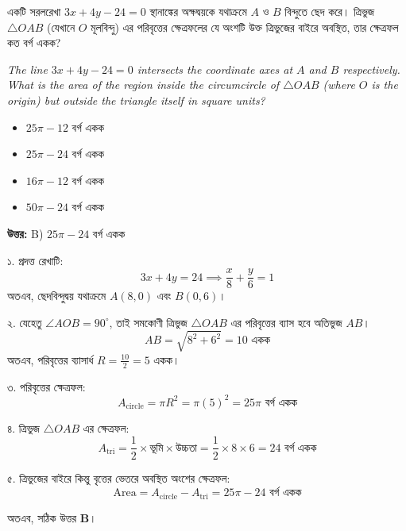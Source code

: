 \documentclass[12pt, a4paper]{article}
\begin{document}
\begin{tcolorbox}[questionbox={প্রশ্ন (Question) 43}]
    \noindent
    একটি সরলরেখা $3x + 4y - 24 = 0$ স্থানাঙ্কের অক্ষদ্বয়কে যথাক্রমে $A$ ও $B$ বিন্দুতে ছেদ করে। ত্রিভুজ $\triangle OAB$ (যেখানে $O$ মূলবিন্দু) এর পরিবৃত্তের ক্ষেত্রফলের যে অংশটি উক্ত ত্রিভুজের বাইরে অবস্থিত, তার ক্ষেত্রফল কত বর্গ একক?
    
    \vspace{0.8em}
    \begin{english}
    \noindent\textit{\color{darkgray}
    The line $3x + 4y - 24 = 0$ intersects the coordinate axes at $A$ and $B$ respectively. What is the area of the region inside the circumcircle of $\triangle OAB$ (where $O$ is the origin) but outside the triangle itself in square units?
    }
    \end{english}
\end{tcolorbox}

\vspace{1em}
\begin{itemize}[label={}, leftmargin=1cm, itemsep=0.5em]
    \item[\textbf{A)}] $25\pi - 12$ বর্গ একক
    \item[\textbf{B)}] $25\pi - 24$ বর্গ একক
    \item[\textbf{C)}] $16\pi - 12$ বর্গ একক
    \item[\textbf{D)}] $50\pi - 24$ বর্গ একক
\end{itemize}

\vspace{0.5em}
\begin{tcolorbox}[answerbox]
    \textbf{\color{success} উত্তর:} B) $25\pi - 24$ বর্গ একক
\end{tcolorbox}
\vspace{1em}

\begin{tcolorbox}[solutionbox={সমাধান (Solution)}]
    \noindent
    ১. প্রদত্ত রেখাটি: 
    \[ 3x + 4y = 24 \implies \frac{x}{8} + \frac{y}{6} = 1 \]
    অতএব, ছেদবিন্দুদ্বয় যথাক্রমে $A(8, 0)$ এবং $B(0, 6)$। 
    
    ২. যেহেতু $\angle AOB = 90^{\circ}$, তাই সমকোণী ত্রিভুজ $\triangle OAB$ এর পরিবৃত্তের ব্যাস হবে অতিভুজ $AB$। 
    \[ AB = \sqrt{8^2 + 6^2} = 10 \text{ একক} \]
    অতএব, পরিবৃত্তের ব্যাসার্ধ $R = \frac{10}{2} = 5$ একক। 
    
    ৩. পরিবৃত্তের ক্ষেত্রফল: 
    \[ A_{\text{circle}} = \pi R^2 = \pi (5)^2 = 25\pi \text{ বর্গ একক} \]
    
    ৪. ত্রিভুজ $\triangle OAB$ এর ক্ষেত্রফল: 
    \[ A_{\text{tri}} = \frac{1}{2} \times \text{ভূমি} \times \text{উচ্চতা} = \frac{1}{2} \times 8 \times 6 = 24 \text{ বর্গ একক} \]
    
    ৫. ত্রিভুজের বাইরে কিন্তু বৃত্তের ভেতরে অবস্থিত অংশের ক্ষেত্রফল: 
    \[ \text{Area} = A_{\text{circle}} - A_{\text{tri}} = 25\pi - 24 \text{ বর্গ একক} \]
    
    অতএব, সঠিক উত্তর \textbf{B}।
\end{tcolorbox}
\end{document}
